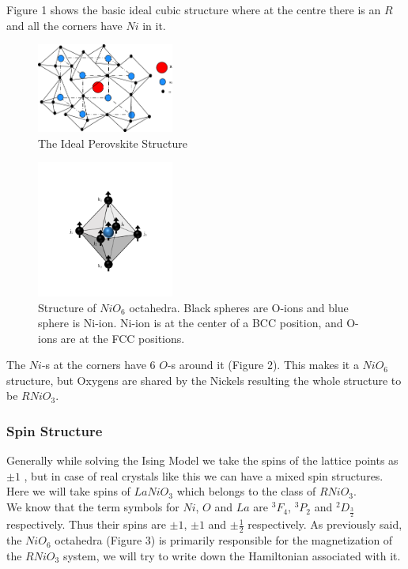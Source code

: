 \documentclass[24pt]{article}
\begin{document}
Figure 1 shows the basic ideal cubic structure where at the centre there is an $R$ and all the corners have $Ni$ in it.
\begin{figure}[h!]
\centering
	\includegraphics[width=0.4\textwidth]{RNiO3.png}
	\caption{The Ideal Perovskite Structure }
	\end{figure}
	
\begin{figure}[h!]
\centering
	\includegraphics[width=0.4\textwidth]{NiO3.png}
	\caption{Structure of $NiO_6$ octahedra. Black spheres are O-ions and blue sphere is Ni-ion. Ni-ion is at the center of a BCC position, and O-ions are at the FCC positions.}
	\end{figure}
	
The $Ni$-s at the corners have 6 $O$-s around it (Figure 2). This makes it a $NiO_6$ structure, but Oxygens are shared by the Nickels resulting the whole structure to be $RNiO_3$.\\

\subsubsection{{\large \textbf{Spin Structure}}}
\begin{large}
Generally while solving the Ising Model we take the spins of the lattice points as $\pm1$ , but in case of real crystals like this we can have a mixed spin structures. Here we will take spins of $LaNiO_3$ which belongs to the class of $RNiO_3$.\\
We know that the term symbols for $Ni$, $O$ and $La$ are $^3F_4$, $^3P_2$ and  $^2D_{\frac{3}{2}}$ respectively. Thus their spins are $\pm 1$, $\pm 1$ and $\pm\frac{1}{2}$ respectively. As previously said, the $NiO_6$ octahedra (Figure 3) is primarily responsible for the magnetization of the $RNiO_3$ system, we will try to write down the Hamiltonian associated with it.\\
\end{large}
\end{document}

